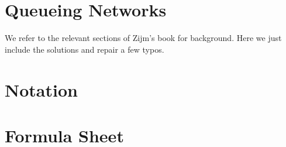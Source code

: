 



%


\chapter{Queueing Networks}
\label{sec:notes-relat-chapt2}

We refer to the relevant sections of Zijm's book for background. Here we just include the solutions and repair a few typos. 


%

%

%

%


\backmatter





\chapter{Notation}
\label{sec:notation}


\chapter{Formula Sheet}


\printindex



